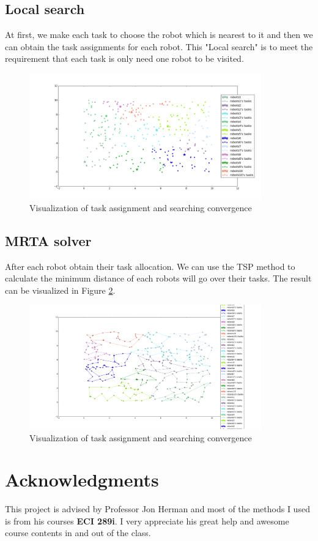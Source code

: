 \documentclass[a4paper]{article}
\begin{document}
\subsection{Local search}
At first, we make each task to choose the robot which is nearest to it and then we can obtain the task assignments for each robot. This "Local search" is to meet the requirement that each task is only need one robot to be visited. 
 \begin{figure}[h]
	\centering
	\includegraphics[width=10cm]{Pictures/taskallocation.png}
	\caption{Visualization of task assignment and searching convergence} 
	\label{figtaskallocation}
\end{figure}

\subsection{MRTA solver}
After each robot obtain their task allocation. We can use the TSP method to calculate the minimum distance of each robots will go over their tasks. The result can be visualized in Figure \ref{figtaskexecution}.
 \begin{figure}[h]
	\centering
	\includegraphics[width=10cm]{Pictures/MRTA.png}
	\caption{Visualization of task assignment and searching convergence} 
	\label{figtaskexecution}
\end{figure}

\section*{Acknowledgments}
This project is advised by Professor Jon Herman and most of the methods I used is from his courses \textbf{ECI 289i}. I very appreciate his great help and awesome course contents in and out of the class. 
\end{document}
